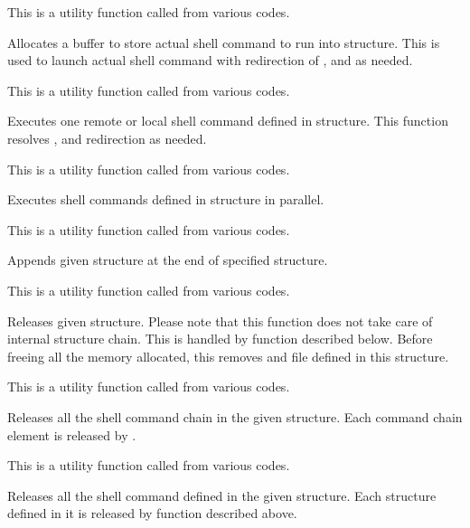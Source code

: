       This is a utility function called from various codes.
  
  
      Allocates a buffer to store actual shell command to run into  structure.
      This is used to launch actual shell command with redirection of ,
	   and  as needed.
      
      This is a utility function called from various codes.
  
  
      Executes one remote or local shell command defined in  structure.
      This function resolves ,  and  redirection as needed.
      
      This is a utility function called from various codes.
  
  
      Executes shell commands defined in  structure in parallel.
      
      This is a utility function called from various codes.
  
  
      Appends given  structure at the end of specified  structure.
      
      This is a utility function called from various codes.
  
  
      Releases given  structure.
      Please note that this function does not take care of internal  structure chain.
      This is handled by  function described below.
      Before freeing all the memory allocated, this removes  and  file
	  defined in this structure.
      
      This is a utility function called from various codes.
  
  
      Releases all the shell command chain in the given  structure.
      Each command chain element is released by .
      
      This is a utility function called from various codes.
  
  
      Releases all the shell command defined in the given  structure.
      Each  structure defined in it is released by  function
	  described above.
      
